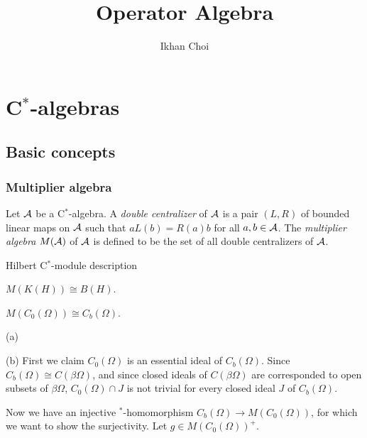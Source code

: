 \documentclass{../../large}
\begin{document}
\title{Operator Algebra}
\author{Ikhan Choi}
\maketitle
\tableofcontents

\part{C$^*$-algebras}
\chapter{Basic concepts}

\section{Multiplier algebra}

\begin{prb}
Let $\mathcal{A}$ be a C$^*$-algebra.
A \emph{double centralizer} of $\mathcal{A}$ is a pair $(L,R)$ of bounded linear maps on $\mathcal{A}$ such that $aL(b)=R(a)b$ for all $a,b\in\mathcal{A}$.
The \emph{multiplier algebra} $M(\mathcal{A})$ of $\mathcal{A}$ is defined to be the set of all double centralizers of $\mathcal{A}$.
\end{prb}

\begin{prb}
\begin{parts}
\item Hilbert C$^*$-module description
\end{parts}
\end{prb}

\begin{prb}
\begin{parts}
\item $M(K(H))\cong B(H)$.
\item $M(C_0(\Omega))\cong C_b(\Omega)$.
\end{parts}
\end{prb}
\begin{pf}
(a)

(b)
First we claim $C_0(\Omega)$ is an essential ideal of $C_b(\Omega)$.
Since $C_b(\Omega)\cong C(\beta\Omega)$, and since closed ideals of $C(\beta\Omega)$ are corresponded to open subsets of $\beta\Omega$, $C_0(\Omega)\cap J$ is not trivial for every closed ideal $J$ of $C_b(\Omega)$.

Now we have an injective $^*$-homomorphism $C_b(\Omega)\to M(C_0(\Omega))$, for which we want to show the surjectivity.
Let $g\in M(C_0(\Omega))^+$.
\end{pf}
\end{document}
